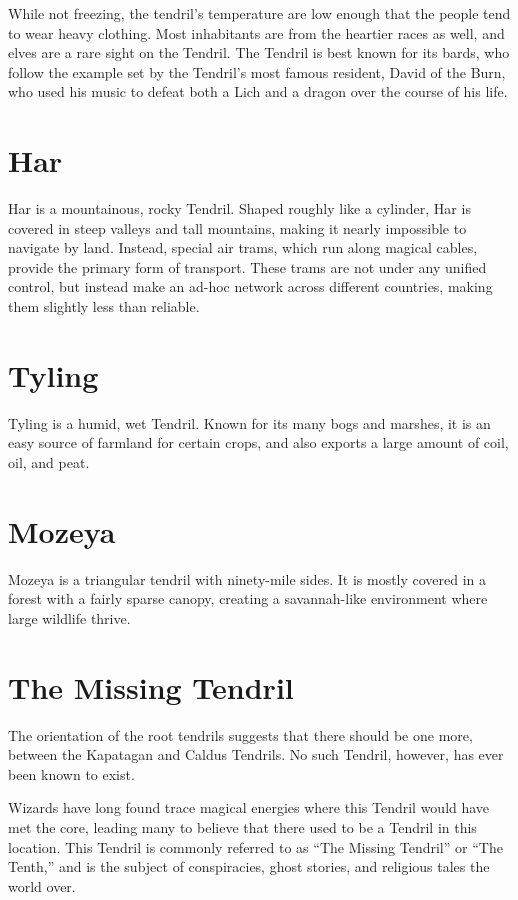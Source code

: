 \begin{multicols}{2}
While not freezing, the tendril's temperature are low enough that the people tend to wear heavy clothing.
Most inhabitants are from the heartier races as well, and elves are a rare sight on the Tendril.
The Tendril is best known for its bards, who follow the example set by the Tendril's most famous resident, David of the Burn, who used his music to defeat both a Lich and a dragon over the course of his life.

\section{Har}
Har is a mountainous, rocky Tendril.
Shaped roughly like a cylinder, Har is covered in steep valleys and tall mountains, making it nearly impossible to navigate by land.
Instead, special air trams, which run along magical cables, provide the primary form of transport.
These trams are not under any unified control, but instead make an ad-hoc network across different countries, making them slightly less than reliable.

\section{Tyling}
Tyling is a humid, wet Tendril.
Known for its many bogs and marshes, it is an easy source of farmland for certain crops, and also exports a large amount of coil, oil, and peat.




\section{Mozeya}
Mozeya is a triangular tendril with ninety-mile sides.
It is mostly covered in a forest with a fairly sparse canopy, creating a savannah-like environment where large wildlife thrive.

\section{The Missing Tendril}
 The orientation of the root tendrils suggests that there should be one more, between the Kapatagan and Caldus Tendrils.
No such Tendril, however, has ever been known to exist.

Wizards have long found trace magical energies where this Tendril would have met the core, leading many to believe that there used to be a Tendril in this location.
This Tendril is commonly referred to as ``The Missing Tendril'' or ``The Tenth,'' and is the subject of conspiracies, ghost stories, and religious tales the world over.

\end{multicols}
